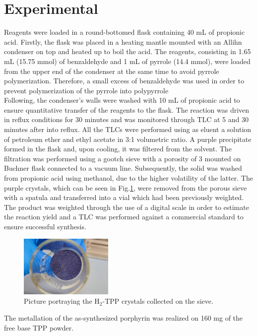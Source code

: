 \documentclass[twoside,twocolumn,9pt]{article}
\begin{document}
\section{Experimental}
Reagents were loaded in a round-bottomed flask containing 40 mL of propionic acid.
Firstly, the flask was placed in a heating mantle mounted with an Allihn condenser on top and heated up to boil the acid.
The reagents, consisting in 1.65 mL (15.75 mmol) of benzaldehyde and 1 mL of pyrrole (14.4 mmol), were loaded from the upper end of the condenser at the same time to avoid pyrrole polymerization.
Therefore, a small excess of benzaldehyde was used in order to prevent polymerization of the pyrrole into polypyrrole \\
Following, the condenser's walls were washed with 10 mL of propionic acid to ensure quantitative transfer of the reagents to the flask.
The reaction was driven in reflux conditions for 30 minutes and was monitored through TLC at 5 and 30 minutes after into reflux.
All the TLCs were performed using as eluent a solution of petroleum ether and ethyl acetate in 3:1 volumetric ratio.
A purple precipitate formed in the flask and, upon cooling, it was filtered from the solvent.
The filtration was performed using a gootch sieve with a porosity of 3 mounted on Buchner flask connected to a vacuum line.
Subsequently, the solid was washed from propionic acid using methanol, due to the higher volatility of the latter.
The purple crystals, which can be seen in Fig.\ref{pic-tpp}, were removed from the porous sieve with a spatula and transferred into a vial which had been previously weighted.
The product was weighted through the use of a digital scale in order to estimate the reaction yield and a TLC was performed against a commercial standard to ensure successful synthesis.\\
\begin{figure}[h]
	\centering
	\includegraphics[width=0.4\textwidth]{photo-tpp}
	\caption{Picture portraying the H$_{2}$-TPP crystals collected on the sieve.}
	\label{pic-tpp}
\end{figure}
\break
The metallation of the as-synthesized porphyrin was realized on 160 mg of the free base TPP powder.
\end{document}
